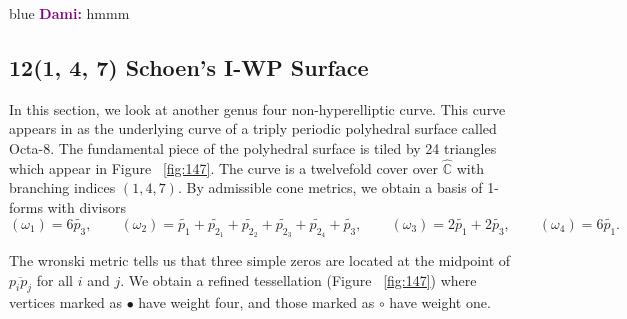 \documentclass[12pt,reqno]{amsart}
\newenvironment{dami}{
  \medskip
\begin{color}{blue}
    \textcolor{purple}{\textbf{Dami:}} 
}{
\end{color}
  \medskip
}
\newcommand{\C}{\mathbb{C}}
\theoremstyle{definition}
\theoremstyle{remark}
\begin{document}
\begin{dami} hmmm \end{dami}


\subsection*{12(1, 4, 7) Schoen's I-WP Surface}


In this section, we look at another genus four non-hyperelliptic curve. This curve appears in \cite{dthesis} as the underlying curve of a triply periodic polyhedral surface called Octa-8. The fundamental piece of the polyhedral surface is tiled by 24 triangles which appear in Figure~ \cref{fig:147}. The curve is a twelvefold cover over $\widehat{\C}$ with branching indices $(1, 4, 7).$ By admissible cone metrics, we obtain a basis of 1-forms with divisors $$(\omega_1) = 6 \widetilde{p_3}, \qquad (\omega_2) = \widetilde{p_1} + \widetilde{p_{2_1}} + \widetilde{p_{2_2}} + \widetilde{p_{2_3}} + \widetilde{p_{2_4}} + \widetilde{p_3}, \qquad (\omega_3) = 2 \widetilde{p_1} + 2 \widetilde{p_3}, \qquad (\omega_4) = 6 \widetilde{p_1}.$$

The wronski metric tells us that three simple zeros are located at the midpoint of $\overline{p_i p_j}$ for all $i$ and $j.$ We obtain a refined tessellation (Figure~ \cref{fig:147}) where vertices marked as $\bullet$ have weight four, and those marked as $\circ$ have weight one. 
\end{document}
